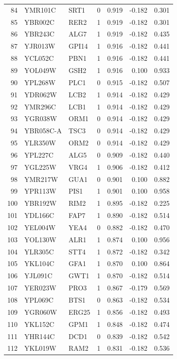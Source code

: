 \begin{longtable}{rllrrrr}
84 & YMR101C & SRT1 & 0 & 0.919 & -0.182 & 0.301\\
85 & YBR002C & RER2 & 1 & 0.919 & -0.182 & 0.301\\
86 & YBR243C & ALG7 & 1 & 0.919 & -0.182 & 0.435\\
87 & YJR013W & GPI14 & 1 & 0.916 & -0.182 & 0.441\\
88 & YCL052C & PBN1 & 1 & 0.916 & -0.182 & 0.441\\
89 & YOL049W & GSH2 & 1 & 0.916 & 0.100 & 0.933\\
90 & YPL268W & PLC1 & 0 & 0.915 & -0.182 & 0.507\\
91 & YDR062W & LCB2 & 1 & 0.914 & -0.182 & 0.429\\
92 & YMR296C & LCB1 & 1 & 0.914 & -0.182 & 0.429\\
93 & YGR038W & ORM1 & 0 & 0.914 & -0.182 & 0.429\\
94 & YBR058C-A & TSC3 & 0 & 0.914 & -0.182 & 0.429\\
95 & YLR350W & ORM2 & 0 & 0.914 & -0.182 & 0.429\\
96 & YPL227C & ALG5 & 0 & 0.909 & -0.182 & 0.440\\
97 & YGL225W & VRG4 & 1 & 0.906 & -0.182 & 0.412\\
98 & YMR217W & GUA1 & 0 & 0.901 & 0.100 & 0.882\\
99 & YPR113W & PIS1 & 1 & 0.901 & 0.100 & 0.958\\
100 & YBR192W & RIM2 & 1 & 0.895 & -0.182 & 0.225\\
101 & YDL166C & FAP7 & 1 & 0.890 & -0.182 & 0.514\\
102 & YEL004W & YEA4 & 0 & 0.882 & -0.182 & 0.470\\
103 & YOL130W & ALR1 & 1 & 0.874 & 0.100 & 0.956\\
104 & YLR305C & STT4 & 1 & 0.872 & -0.182 & 0.342\\
105 & YKL104C & GFA1 & 1 & 0.870 & 0.100 & 0.864\\
106 & YJL091C & GWT1 & 1 & 0.870 & -0.182 & 0.514\\
107 & YER023W & PRO3 & 1 & 0.867 & -0.179 & 0.569\\
108 & YPL069C & BTS1 & 0 & 0.863 & -0.182 & 0.534\\
109 & YGR060W & ERG25 & 1 & 0.856 & -0.182 & 0.493\\
110 & YKL152C & GPM1 & 1 & 0.848 & -0.182 & 0.474\\
111 & YHR144C & DCD1 & 0 & 0.839 & -0.182 & 0.542\\
112 & YKL019W & RAM2 & 1 & 0.831 & -0.182 & 0.536\\

\end{longtable}
